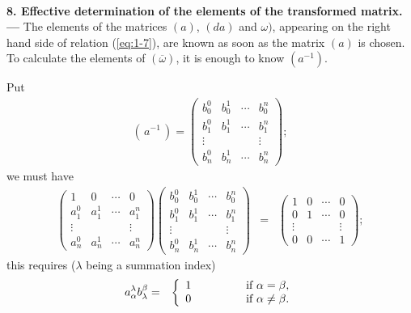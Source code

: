 
\ \\

{\bf 8. Effective determination of the elements of the transformed matrix. --- }
% 
The elements of the matrices $(a)$, $(da)$ and $\omega)$, appearing on the right hand side of relation (\ref{eq:1-7}), are known as soon as the matrix $(a)$ is chosen. To calculate the elements of $(\overline \omega)$, it is enough to know $(a^{-1})$.

Put
\begin{eqnarray*}
(\, a^{-1} \,) = \left(
\begin{array}{cccc}
b^0_0 &  b^1_0  & \cdots & b^n_0 \\
b^0_1 &  b^1_1  & \cdots & b^n_1 \\
\vdots &    &  & \vdots \\
b^0_n &  b^1_n  & \cdots & b^n_n 
\end{array}
\right); 
\end{eqnarray*}
we must have
\begin{eqnarray*}
\left(
\begin{array}{cccc}
1 &  0  & \cdots & 0 \\
a^0_1 &  a^1_1  & \cdots & a^n_1 \\
\vdots &    &  & \vdots \\
a^0_n &  a^1_n  & \cdots & a^n_n 
\end{array}
\right)
 \left(
\begin{array}{cccc}
b^0_0 &  b^1_0  & \cdots & b^n_0 \\
b^0_1 &  b^1_1  & \cdots & b^n_1 \\
\vdots &    &  & \vdots \\
b^0_n &  b^1_n  & \cdots & b^n_n 
\end{array}
\right)
&=& 
\left(
\begin{array}{cccc}
1 &  0   & \cdots & 0 \\
0 &  1    & \cdots & 0 \\
\vdots &    &  & \vdots \\
0 &  0    & \cdots & 1 
\end{array}
\right);
\end{eqnarray*}
this requires ($\lambda$ being a summation index)
\begin{eqnarray*}
a^\lambda_\alpha b^\beta_\lambda &=& 
\left\{
\begin{array}{lll}
1& \hspace*{1cm} & \mbox{if } \alpha = \beta , \\ 
0& \hspace*{1cm} & \mbox{if } \alpha \neq \beta .
\end{array}
\right.
\end{eqnarray*}

